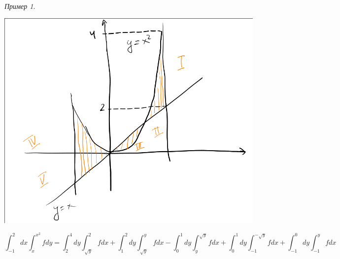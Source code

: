 \documentclass[english]{article}
\theoremstyle{plain}
\theoremstyle{remark}
\newtheorem*{examp}{Пример}
\theoremstyle{definition}
\begin{document}
\begin{examp}
\-
\begin{center}
\includegraphics[scale=0.4]{2_5.png}
\end{center}
\[ \int^2_{-1} dx \int^{x^2}_x f dy = \int^4_2 dy \int^2_{\sqrt{y}} f dx + \int^2_1 dy \int^y_{\sqrt{y}} f dx - \int^1_0 dy \int^{\sqrt{y}}_y f dx + \int^1_0 dy \int^{-\sqrt{y}}_{-1} f dx + \int^0_{-1} dy \int^y_{-1} f dx \]
\end{examp}
\end{document}
